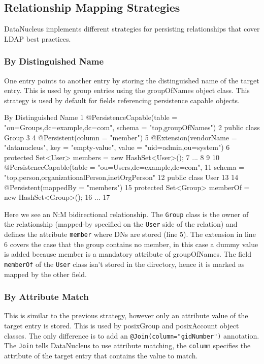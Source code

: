 \documentclass[a4paper,11pt,oneside]{article}
\begin{document}
\subsection{Relationship Mapping Strategies}
DataNucleus implements different strategies for persisting relationships that cover LDAP best practices.

\subsubsection{By Distinguished Name}
One entry points to another entry by storing the distinguished name of the target entry. This is used by group entries using the groupOfNames object class. This strategy is used by default for fields referencing persistence capable objects.
\begin{SaveVerbatim}{By Distinguished Name}
 1  @PersistenceCapable(table = "ou=Groups,dc=example,dc=com", schema = "top,groupOfNames")
 2  public class Group
 3  {
 4      @Persistent(column = "member")
 5      @Extension(vendorName = "datanucleus", key = "empty-value", value = "uid=admin,ou=system")
 6      protected Set<User> members = new HashSet<User>();
 7      ...
 8  }
 9  
10  @PersistenceCapable(table = "ou=Users,dc=example,dc=com", 
11      schema = "top,person,organizationalPerson,inetOrgPerson"
12  public class User
13  {
14      @Persistent(mappedBy = "members")
15      protected Set<Group> memberOf = new HashSet<Group>();
16      ...
17  }
\end{SaveVerbatim}
\begin{figure}[htb]
\end{figure}
Here we see an N:M bidirectional relationship. The \texttt{Group} class is the owner of the relationship (mapped-by specified on the \texttt{User} side of the relation) and defines the attribute \texttt{member} where DNs are stored (line 5). The extension in line 6 covers the case that the group contains no member, in this case a dummy value is added because member is a mandatory attribute of groupOfNames. The field \texttt{memberOf} of the \texttt{User} class isn't stored in the directory, hence it is marked as mapped by the other field.

\subsubsection{By Attribute Match}
This is similar to the previous strategy, however only an attribute value of the target entry is stored. This is used by posixGroup and posixAccount object classes. The only difference is to add an \texttt{@Join(column="gidNumber")} annotation. The \texttt{Join} tells DataNucleus to use attribute matching, the \texttt{column} specifies the attribute of the target entry that contains the value to match.
\end{document}
